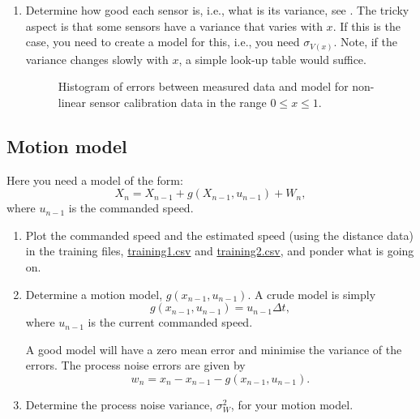 \documentclass[a4paper, 12]{article}
\renewcommand{\var}[1]{\sigma_{#1}^2}
\newcommand{\std}[1]{\sigma_{#1}}
\begin{document}
\begin{enumerate}
\item Determine how good each sensor is, i.e., what is its variance,
  see .  The tricky aspect is that some sensors have
  a variance that varies with $x$.  If this is the case, you need to
  create a model for this, i.e., you need $\std{V(x)}$.  Note, if the
  variance changes slowly with $x$, a simple look-up table would
  suffice.

  \begin{figure}[!h]
  \centering
  
  \caption{Histogram of errors between measured data and model for
    non-linear sensor calibration data in the range $0 \le x \le 1$.}
  \label{fig:histogram}
  \end{figure}
  
\end{enumerate}

  
\subsection{Motion model}

Here you need a model of the form:
%  
\begin{equation}
  X_n = X_{n-1} + g(X_{n-1}, u_{n-1}) + W_n,
\end{equation}
%
where $u_{n-1}$ is the commanded speed.

\begin{enumerate}
\item Plot the commanded speed and the estimated speed (using the
  distance data) in the training files, \url{training1.csv} and
  \url{training2.csv}, and ponder what is going on.

\item Determine a motion model, $g(x_{n-1}, u_{n-1})$.  A crude model
  is simply
  \begin{equation}
    g(x_{n-1}, u_{n-1}) = u_{n-1} \Delta t,
  \end{equation}
  where $u_{n-1}$ is the current commanded speed.
  
  A good model will have a zero mean error and minimise the variance
  of the errors.  The process noise errors are given by
  \begin{equation}
    w_n = x_n - x_{n-1} - g(x_{n-1}, u_{n-1}).
  \end{equation}

\item Determine the process noise variance, $\var{W}$, for your motion model.
  
\end{enumerate}
\end{document}
